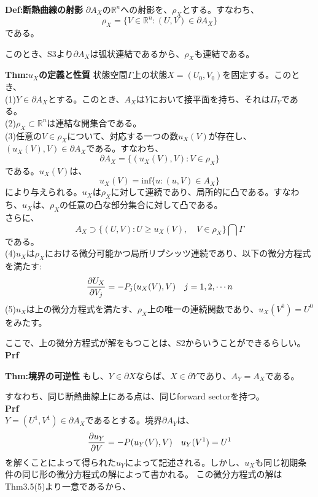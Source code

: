 \documentclass[a4paper,11pt]{jsarticle}
\numberwithin{equation}{section}
\begin{document}
\begin{itembox}[l]{\textbf{Def:断熱曲線の射影}}
    $\partial A_X$の$\mathbb{R}^n$への射影を、$\rho_X$とする。すなわち、
    \begin{equation}
        \rho_X =\{V\in \mathbb{R}^n:(U,V) \in \partial A_X\}
    \end{equation}
    である。
\end{itembox}
このとき、S3より$\partial A_X$は弧状連結であるから、$\rho_X$も連結である。\\
\begin{itembox}[l]{\textbf{Thm:$u_X$の定義と性質}}
    状態空間$\Gamma$上の状態$X=(U_0,V_0)$を固定する。このとき、\\
    (1)$Y\in \partial A_X$とする。このとき、$A_X$は$Y$において接平面を持ち、それは$\Pi_Y$である。\\
    (2)$\rho_X \subset \mathbb{R}^n $は連結な開集合である。\\
    (3)任意の$V \in \rho_X$について、対応する一つの数$u_X(V)$が存在し、$(u_X(V),V) \in \partial A_X$である。すなわち、
    \begin{equation}
        \partial A_X =\{(u_X(V),V):V \in \rho_X\}
    \end{equation}
    である。$u_X(V)$は、
    \begin{equation}
        u_X(V) =\text{inf}\{u:(u,V) \in A_X \}
    \end{equation}
    により与えられる。$u_X$は$\rho_X$に対して連続であり、局所的に凸である。すなわち、$u_X$は、$\rho_X$の任意の凸な部分集合に対して凸である。\\
    さらに、
    \begin{equation}
        A_X \supset \{(U,V):U \geq u_X(V),\quad V\in \rho_X\} \bigcap \Gamma
    \end{equation}
    である。\\
    (4)$u_X$は$\rho_X$における微分可能かつ局所リプシッツ連続であり、以下の微分方程式を満たす:
    \begin{equation}
        \pdv{U_X}{V_j}(V) =-P_j (u_X(V),V) \quad j=1,2,\cdots n
    \end{equation}
    (5)$u_X$は上の微分方程式を満たす、$\rho_X$上の唯一の連続関数であり、$u_X(V^0) =U^0$をみたす。
\end{itembox}
ここで、上の微分方程式が解をもつことは、S2からいうことができるらしい。\\
\textbf{Prf}\\


\begin{itembox}[l]{\textbf{Thm:境界の可逆性}}
もし、$Y \in \partial X$ならば、$X \in \partial Y$であり、$A_Y = A_X$である。
\end{itembox}
すなわち、同じ断熱曲線上にある点は、同じforward sectorを持つ。\\
\textbf{Prf}\\
$Y =(U^1,V^1)\in \partial A_X$であるとする。境界$\partial A_Y$は、
\begin{align}
    \pdv{u_Y}{V}(V) = -P(u_Y(V),V) \quad  u_Y(V^1) =U^1
\end{align}
を解くことによって得られた$u_Y$によって記述される。しかし、$u_X$も同じ初期条件の同じ形の微分方程式の解によって書かれる。
この微分方程式の解はThm3.5(5)より一意であるから、
\end{document}
